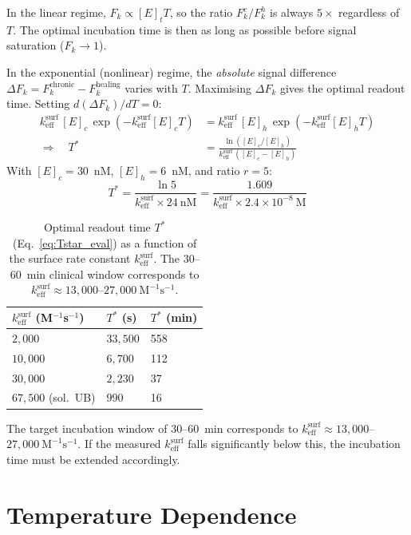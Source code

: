 \documentclass[10pt,a4paper]{article}
\numberwithin{equation}{section}
\newcommand{\Mms}{\text{M}^{-1}\text{s}^{-1}}
\newcommand{\keff}{k_{\text{eff}}}
\begin{document}
In the linear regime, $F_k \propto [E]_t T$, so the ratio $F_k^c/F_k^h$ is
always $5\times$ regardless of $T$. The optimal incubation time is then as long as
possible before signal saturation ($F_k \to 1$).

In the exponential (nonlinear) regime, the \emph{absolute} signal difference
$\Delta F_k = F_k^{\text{chronic}} - F_k^{\text{healing}}$ varies with $T$.
Maximising $\Delta F_k$ gives the optimal readout time. Setting
$d(\Delta F_k)/dT = 0$:
\begin{align}
  \keff^{\text{surf}}\,[E]_c\,\exp\!\left(-\keff^{\text{surf}}[E]_c T\right)
  &= \keff^{\text{surf}}\,[E]_h\,\exp\!\left(-\keff^{\text{surf}}[E]_h T\right) \nonumber\\
  \Rightarrow\quad
  T^* &= \frac{\ln([E]_c/[E]_h)}{\keff^{\text{surf}}\,([E]_c - [E]_h)}
  \label{eq:Tstar}
\end{align}
With $[E]_c = 30$~nM, $[E]_h = 6$~nM, and ratio $r = 5$:
\begin{equation}
  \label{eq:Tstar_eval}
  T^* = \frac{\ln 5}{\keff^{\text{surf}} \times 24\ \text{nM}}
  = \frac{1.609}{\keff^{\text{surf}} \times 2.4\times10^{-8}\ \text{M}}
\end{equation}
\begin{table}[H]
\centering
\small\renewcommand{\arraystretch}{1.25}
\begin{tabular}{@{}lll@{}}
\toprule
$\keff^{\text{surf}}$ (M$^{-1}$s$^{-1}$) & $T^*$ (s) & $T^*$ (min) \\
\midrule
$2{,}000$    & $33{,}500$ & 558 \\
$10{,}000$   & $6{,}700$  & 112 \\
$30{,}000$   & $2{,}230$  &  37 \\
$67{,}500$ (sol.\ UB) & $990$ & 16 \\
\bottomrule
\end{tabular}
\caption{Optimal readout time $T^*$ (Eq.~\eqref{eq:Tstar_eval}) as a function of the surface
rate constant $\keff^{\text{surf}}$. The 30--60~min clinical window
corresponds to $\keff^{\text{surf}} \approx 13{,}000$--$27{,}000\ \Mms$.}
\label{tab:Tstar}
\end{table}
The target incubation window of 30--60~min corresponds to
$\keff^{\text{surf}} \approx 13{,}000$--$27{,}000\ \Mms$. If the measured
$\keff^{\text{surf}}$ falls significantly below this, the incubation time must be
extended accordingly.

\section{Temperature Dependence}
\label{sec:temperature}
\end{document}
